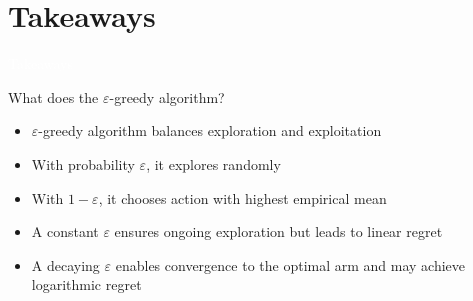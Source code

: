 \documentclass[11pt,table]{beamer}
\begin{document}
\section{Takeaways}
{
\begin{frame}
\centering
\Huge
\textcolor{white}{Takeaways}
\thispagestyle{empty}
\end{frame}
}

\begin{frame}{What does the $\varepsilon$-greedy algorithm?}
\begin{itemize}
    \item $\varepsilon$-greedy algorithm balances exploration and exploitation
		\item With probability $\varepsilon$, it explores randomly
    \item With $1 - \varepsilon$, it chooses action with highest empirical mean
    \item A constant $\varepsilon$ ensures ongoing exploration but leads to linear regret
    \item A decaying $\varepsilon$ enables convergence to the optimal arm and may achieve logarithmic regret
\end{itemize}



\end{frame}
\end{document}
